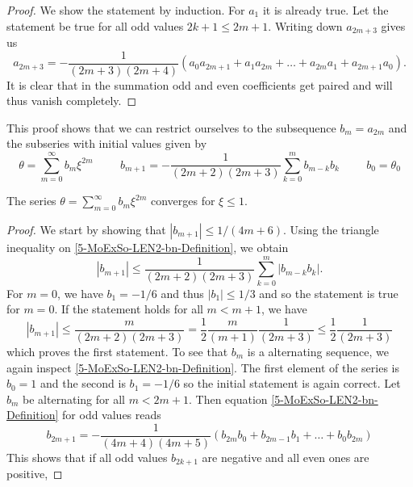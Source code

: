 \begin{appendix}
\begin{section}
\begin{proof}
	We show the statement by induction. For $a_1$ it is already true. Let the statement be true 
	for all odd values $2k+1\leq2m+1$. Writing down $a_{2m+3}$ gives us
	\begin{equation}
		a_{2m+3} = -\frac{1}{(2m+3)(2m+4)}\left(a_0a_{2m+1}+a_1a_{2m}+\dots+a_{2m}a_1+a_{2m+1}a_0\right).
	\end{equation}
	It is clear that in the summation odd and even coefficients get paired and will thus 
	vanish completely.
\end{proof}\noindent
This proof shows that we can restrict ourselves to the subsequence $b_m=a_{2m}$ and 
the subseries with initial values given by
\begin{equation}
	\theta = \sum\limits_{m=0}^\infty b_m\xi^{2m} \hspace{1cm} b_{m+1} = 
	-\frac{1}{(2m+2)(2m+3)}\sum\limits_{k=0}^mb_{m-k}b_k \hspace{1cm} b_0=\theta_0
	\label{5-MoExSo-LEN2-bn-Definition}
\end{equation}
\begin{theorem}
	The series $\theta=\sum\limits_{m=0}^\infty b_m\xi^{2m}$ converges for $\xi\leq1$.
\end{theorem}
\begin{proof}
	We start by showing that $|b_{m+1}|\leq1/(4m+6)$. Using the triangle inequality on 
	\ref{5-MoExSo-LEN2-bn-Definition}, we obtain
	\begin{equation}
		|b_{m+1}| \leq \frac{1}{(2m+2)(2m+3)}\sum\limits_{k=0}^m|b_{m-k}b_k|.
	\end{equation}
	For $m=0$, we have $b_1=-1/6$ and thus $|b_1|\leq1/3$ and so the statement is true for $m=0$.
	If the statement holds for all $m<m+1$, we have
	\begin{equation}
		|b_{m+1}| \leq \frac{m}{(2m+2)(2m+3)} = \frac{1}{2}\frac{m}{(m+1)}\frac{1}{(2m+3)}
		\leq\frac{1}{2}\frac{1}{(2m+3)}
	\end{equation}
	which proves the first statement. To see that $b_m$ is a alternating sequence, we again inspect
	\ref{5-MoExSo-LEN2-bn-Definition}. The first element of the series is 
	$b_0=1$ and the second is $b_1=-1/6$ so the initial statement is again correct. Let $b_m$ be 
	alternating for all $m<2m+1$. Then equation \ref{5-MoExSo-LEN2-bn-Definition} for odd values reads
	\begin{equation}
		b_{2m+1} = -\frac{1}{(4m+4)(4m+5)}\left(b_{2m}b_0+b_{2m-1}b_1+\dots+b_0b_{2m}\right)
	\end{equation}
	This shows that if all odd values $b_{2k+1}$ are negative and all even ones are positive, 

\end{proof}
\end{section}
\end{appendix}
